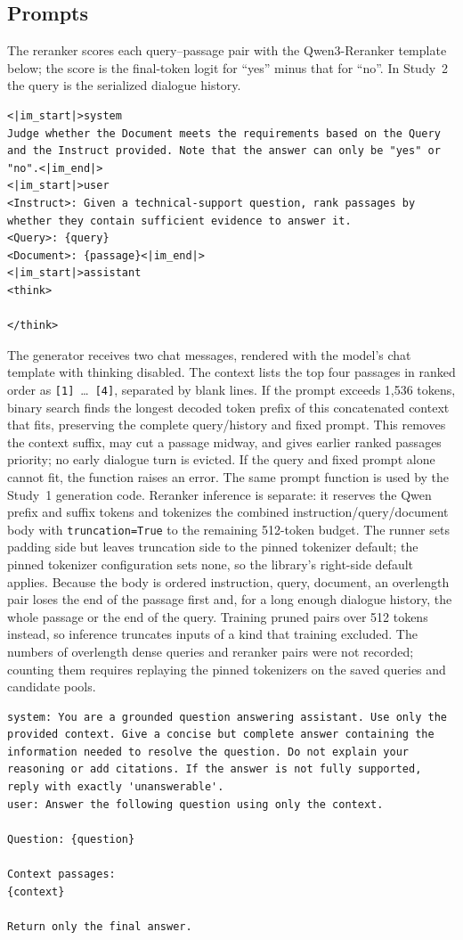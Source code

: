 \subsection{Prompts}\label{supp:prompts}
The reranker scores each query--passage pair with the Qwen3-Reranker template below; the score is the final-token logit for ``yes'' minus that for ``no''. In Study~2 the query is the serialized dialogue history.
\begin{lstlisting}
<|im_start|>system
Judge whether the Document meets the requirements based on the Query and the Instruct provided. Note that the answer can only be "yes" or "no".<|im_end|>
<|im_start|>user
<Instruct>: Given a technical-support question, rank passages by whether they contain sufficient evidence to answer it.
<Query>: {query}
<Document>: {passage}<|im_end|>
<|im_start|>assistant
<think>

</think>

\end{lstlisting}
The generator receives two chat messages, rendered with the model's chat template with thinking disabled. The context lists the top four passages in ranked order as \texttt{[1]}~\ldots~\texttt{[4]}, separated by blank lines. If the prompt exceeds 1,536 tokens, binary search finds the longest decoded token prefix of this concatenated context that fits, preserving the complete query/history and fixed prompt. This removes the context suffix, may cut a passage midway, and gives earlier ranked passages priority; no early dialogue turn is evicted. If the query and fixed prompt alone cannot fit, the function raises an error. The same prompt function is used by the Study~1 generation code. Reranker inference is separate: it reserves the Qwen prefix and suffix tokens and tokenizes the combined instruction/query/document body with \texttt{truncation=True} to the remaining 512-token budget. The runner sets padding side but leaves truncation side to the pinned tokenizer default; the pinned tokenizer configuration sets none, so the library's right-side default applies. Because the body is ordered instruction, query, document, an overlength pair loses the end of the passage first and, for a long enough dialogue history, the whole passage or the end of the query. Training pruned pairs over 512 tokens instead, so inference truncates inputs of a kind that training excluded. The numbers of overlength dense queries and reranker pairs were not recorded; counting them requires replaying the pinned tokenizers on the saved queries and candidate pools.
\begin{lstlisting}
system: You are a grounded question answering assistant. Use only the provided context. Give a concise but complete answer containing the information needed to resolve the question. Do not explain your reasoning or add citations. If the answer is not fully supported, reply with exactly 'unanswerable'.
user: Answer the following question using only the context.

Question: {question}

Context passages:
{context}

Return only the final answer.
\end{lstlisting}
